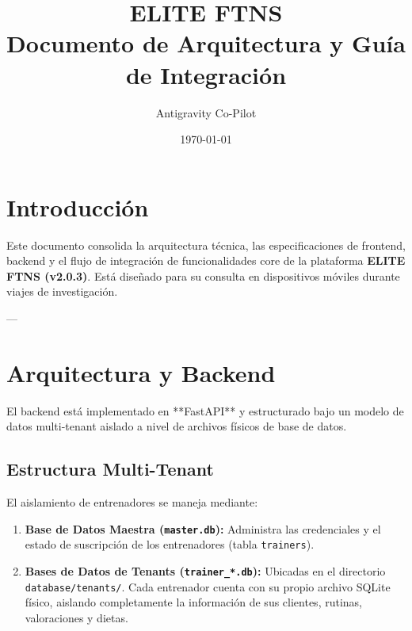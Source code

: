\documentclass[11pt]{article}
\title{\textbf{\large ELITE FTNS \\ Documento de Arquitectura y Guía de Integración}}
\author{\small Antigravity Co-Pilot}
\date{\footnotesize \today}
\begin{document}
\maketitle

\section{Introducción}
Este documento consolida la arquitectura técnica, las especificaciones de frontend, backend y el flujo de integración de funcionalidades core de la plataforma \textbf{ELITE FTNS (v2.0.3)}. Está diseñado para su consulta en dispositivos móviles durante viajes de investigación.

---

\section{Arquitectura y Backend}
El backend está implementado en **FastAPI** y estructurado bajo un modelo de datos multi-tenant aislado a nivel de archivos físicos de base de datos.

\subsection{Estructura Multi-Tenant}
El aislamiento de entrenadores se maneja mediante:
\begin{enumerate}
    \item \textbf{Base de Datos Maestra (\texttt{master.db}):} Administra las credenciales y el estado de suscripción de los entrenadores (tabla \texttt{trainers}).
    \item \textbf{Bases de Datos de Tenants (\texttt{trainer\_*.db}):} Ubicadas en el directorio \texttt{database/tenants/}. Cada entrenador cuenta con su propio archivo SQLite físico, aislando completamente la información de sus clientes, rutinas, valoraciones y dietas.
\end{enumerate}
\end{document}
